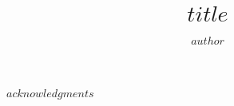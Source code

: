 \documentclass[twoside,12pt,final]{ucthesis-CA2012}
\begin{document}
\begin{ucfrontmatter}


  \title{$title$}
  \author{$author$}

   
  
	\maketitle
	
  
  
\begin{acknowledgements}
    $acknowledgments$
  \end{acknowledgements}


\end{ucfrontmatter}
\end{document}
